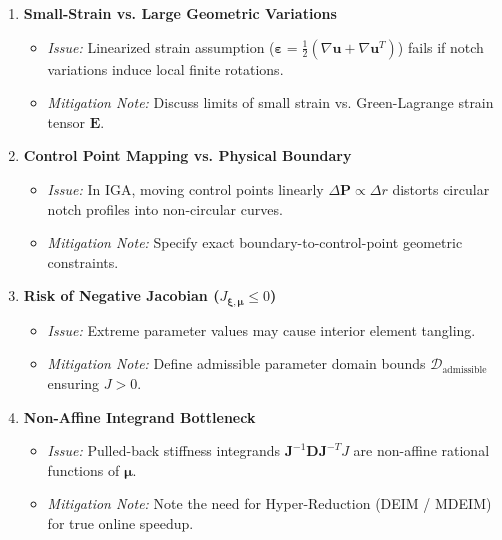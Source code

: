 \documentclass[12pt,a4paper]{article}
\newcommand{\vect}[1]{\mathbf{#1}}
\newcommand{\mat}[1]{\mathbf{#1}}
\begin{document}
\begin{enumerate}[label=\textbf{Critique 4.\arabic*:}, leftmargin=*]
    \item \textbf{Small-Strain vs. Large Geometric Variations}
    \begin{itemize}
        \item \textit{Issue:} Linearized strain assumption ($\boldsymbol{\varepsilon} = \frac{1}{2}(\nabla\vect{u} + \nabla\vect{u}^T)$) fails if notch variations induce local finite rotations.
        \item \textit{Mitigation Note:} Discuss limits of small strain vs. Green-Lagrange strain tensor $\mathbf{E}$.
    \end{itemize}

    \item \textbf{Control Point Mapping vs. Physical Boundary}
    \begin{itemize}
        \item \textit{Issue:} In IGA, moving control points linearly $\Delta \mathbf{P} \propto \Delta r$ distorts circular notch profiles into non-circular curves.
        \item \textit{Mitigation Note:} Specify exact boundary-to-control-point geometric constraints.
    \end{itemize}

    \item \textbf{Risk of Negative Jacobian ($J_{\boldsymbol{\xi},\boldsymbol{\mu}} \le 0$)}
    \begin{itemize}
        \item \textit{Issue:} Extreme parameter values may cause interior element tangling.
        \item \textit{Mitigation Note:} Define admissible parameter domain bounds $\mathcal{D}_{\text{admissible}}$ ensuring $J > 0$.
    \end{itemize}

    \item \textbf{Non-Affine Integrand Bottleneck}
    \begin{itemize}
        \item \textit{Issue:} Pulled-back stiffness integrands $\mathbf{J}^{-1} \mat{D} \mathbf{J}^{-T} J$ are non-affine rational functions of $\boldsymbol{\mu}$.
        \item \textit{Mitigation Note:} Note the need for Hyper-Reduction (DEIM / MDEIM) for true online speedup.
    \end{itemize}
\end{enumerate}
\end{document}
